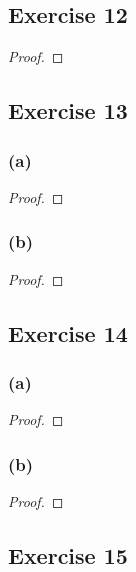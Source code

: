 \documentclass[14pt]{extarticle}
\begin{document}
\subsection{Exercise 12}

\begin{proof}

\end{proof}

\subsection{Exercise 13}

\subsubsection{(a)}

\begin{proof}

\end{proof}

\subsubsection{(b)}

\begin{proof}

\end{proof}

\subsection{Exercise 14}

\subsubsection{(a)}

\begin{proof}

\end{proof}

\subsubsection{(b)}

\begin{proof}

\end{proof}

\subsection{Exercise 15}
\end{document}
